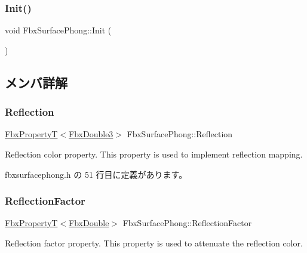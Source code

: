 \subsubsection{\texorpdfstring{Init()}{Init()}}
{\footnotesize\ttfamily void Fbx\+Surface\+Phong\+::\+Init (\begin{DoxyParamCaption}{ }\end{DoxyParamCaption})\hspace{0.3cm}{\ttfamily [protected]}}



\subsection{メンバ詳解}
\mbox{\label{class_fbx_surface_phong_a67159f889406ad672d13e463e840a9ba}} 
\subsubsection{\texorpdfstring{Reflection}{Reflection}}
{\footnotesize\ttfamily \hyperlink{class_fbx_property_t}{Fbx\+PropertyT}$<$\hyperlink{fbxtypes_8h_ae0a96f14cde566774c7553aa7523b7a7}{Fbx\+Double3}$>$ Fbx\+Surface\+Phong\+::\+Reflection}

Reflection color property. This property is used to implement reflection mapping. 

 fbxsurfacephong.\+h の 51 行目に定義があります。

\mbox{\label{class_fbx_surface_phong_a87608ae7193bbac4f63c97f6c5f1dee2}} 
\subsubsection{\texorpdfstring{Reflection\+Factor}{ReflectionFactor}}
{\footnotesize\ttfamily \hyperlink{class_fbx_property_t}{Fbx\+PropertyT}$<$\hyperlink{fbxtypes_8h_a171e72a1c46fc15c1a6c9c31948c1c5b}{Fbx\+Double}$>$ Fbx\+Surface\+Phong\+::\+Reflection\+Factor}

Reflection factor property. This property is used to attenuate the reflection color. 

